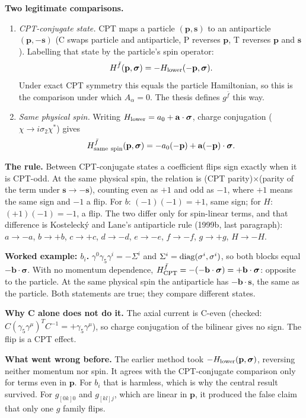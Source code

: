 \documentclass[11pt,a4paper]{article}
\newcommand{\sig}{\bm{\sigma}}
\newcommand{\Aa}{A_\alpha}
\newcommand{\gfb}{g^{\bar f}}
\begin{document}
\textbf{Two legitimate comparisons.}
\begin{enumerate}[leftmargin=1.5em]
\item \emph{CPT-conjugate state.} CPT maps a particle $(\mathbf p,\mathbf
s)$ to an antiparticle $(\mathbf p,-\mathbf s)$ (C swaps particle and
antiparticle, P reverses $\mathbf p$, T reverses $\mathbf p$ and
$\mathbf s$). Labelling that state by the particle's spin operator:
\begin{equation}
H^{\bar f}(\mathbf p,\sig)=-H_{\rm lower}(-\mathbf p,\sig).
\end{equation}
Under exact CPT symmetry this equals the particle Hamiltonian, so this is
the comparison under which $\Aa=0$. The thesis defines $\gfb$ this way.
\item \emph{Same physical spin.} Writing $H_{\rm lower}=a_0+\mathbf
a\cdot\sig$, charge conjugation ($\chi\to i\sigma_2\chi^*$) gives
\begin{equation}
H^{\bar f}_{\rm same\ spin}(\mathbf p,\sig)=-a_0(-\mathbf p)+\mathbf a(-\mathbf p)\cdot\sig .
\end{equation}
\end{enumerate}

\textbf{The rule.} Between CPT-conjugate states a coefficient flips sign
exactly when it is CPT-odd. At the same physical spin, the relation is
(CPT parity)$\times$(parity of the term under $\mathbf s\to-\mathbf s$), counting even as $+1$ and odd as $-1$, where $+1$ means the same sign and $-1$ a flip. For $b$: $(-1)(-1)=+1$, same sign; for $H$: $(+1)(-1)=-1$, a flip.
The two differ only for spin-linear terms, and that difference is
Kostelecký and Lane's antiparticle rule (1999b, last paragraph):
$a\to-a$, $b\to+b$, $c\to+c$, $d\to-d$, $e\to-e$, $f\to-f$, $g\to+g$,
$H\to-H$.

\textbf{Worked example: $b_i$.} $\gamma^0\gamma_5\gamma^i=-\Sigma^i$ and
$\Sigma^i={\rm diag}(\sigma^i,\sigma^i)$, so both blocks equal
$-\mathbf b\cdot\sig$. With no momentum dependence,
$H^{\bar f}_{\rm CPT}=-(-\mathbf b\cdot\sig)=+\mathbf b\cdot\sig$:
opposite to the particle. At the same physical spin the antiparticle has
$-\mathbf b\cdot\mathbf s$, the same as the particle. Both statements are
true; they compare different states.

\textbf{Why C alone does not do it.} The axial current is C-even (checked:
$C(\gamma_5\gamma^\mu)^TC^{-1}=+\gamma_5\gamma^\mu$), so charge conjugation
of the bilinear gives no sign. The flip is a CPT effect.

\textbf{What went wrong before.} The earlier method took $-H_{\rm
lower}(\mathbf p,\sig)$, reversing neither momentum nor spin. It agrees
with the CPT-conjugate comparison only for terms even in $\mathbf p$. For
$b_i$ that is harmless, which is why the central result survived. For
$g_{[0k]0}$ and $g_{[kl]j}$, which are linear in $\mathbf p$, it produced
the false claim that only one $g$ family flips.
\end{document}
